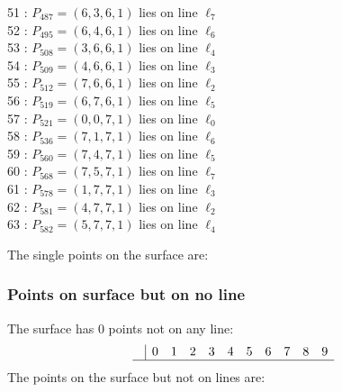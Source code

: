 \documentclass{article}
\begin{document}
{\begin{multicols}{2}
51 : $P_{487}=( 6, 3, 6, 1 )$ lies on line $\ell_{7}$\\
52 : $P_{495}=( 6, 4, 6, 1 )$ lies on line $\ell_{6}$\\
53 : $P_{508}=( 3, 6, 6, 1 )$ lies on line $\ell_{4}$\\
54 : $P_{509}=( 4, 6, 6, 1 )$ lies on line $\ell_{3}$\\
55 : $P_{512}=( 7, 6, 6, 1 )$ lies on line $\ell_{2}$\\
56 : $P_{519}=( 6, 7, 6, 1 )$ lies on line $\ell_{5}$\\
57 : $P_{521}=( 0, 0, 7, 1 )$ lies on line $\ell_{0}$\\
58 : $P_{536}=( 7, 1, 7, 1 )$ lies on line $\ell_{6}$\\
59 : $P_{560}=( 7, 4, 7, 1 )$ lies on line $\ell_{5}$\\
60 : $P_{568}=( 7, 5, 7, 1 )$ lies on line $\ell_{7}$\\
61 : $P_{578}=( 1, 7, 7, 1 )$ lies on line $\ell_{3}$\\
62 : $P_{581}=( 4, 7, 7, 1 )$ lies on line $\ell_{2}$\\
63 : $P_{582}=( 5, 7, 7, 1 )$ lies on line $\ell_{4}$\\
\end{multicols}
The single points on the surface are:\\
\subsubsection*{Points on surface but on no line}
The surface has 0 points not on any line:\\
$$
\begin{array}{r|*{10}{r}}
 & 0 & 1 & 2 & 3 & 4 & 5 & 6 & 7 & 8 & 9\\
\hline
\end{array}
$$
The points on the surface but not on lines are:\\
\begin{multicols}{2}
\noindent
\end{multicols}
}
\end{document}
